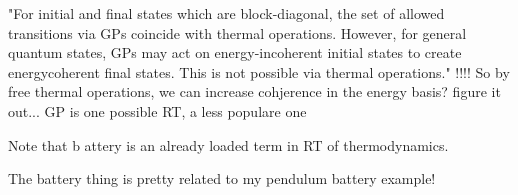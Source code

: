\documentclass{article}
\begin{document}
"For initial and final states which are block-diagonal, the set of allowed transitions via GPs coincide with thermal operations. However, for general quantum states, GPs may act on energy-incoherent initial states to create energycoherent final states. This is not possible via thermal operations."
!!!! So by free thermal operations, we can increase cohjerence in the energy basis? figure it out...
GP is one possible RT, a less populare one

Note that b attery is an already loaded term in RT of thermodynamics.

The battery thing is pretty related to my pendulum battery example!
\end{document}
